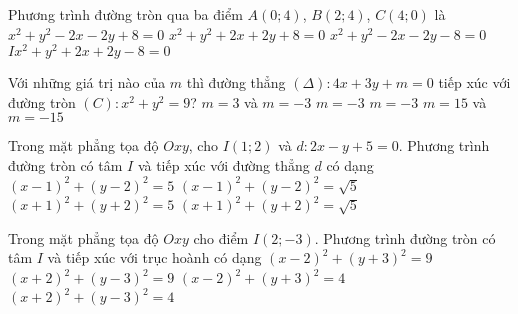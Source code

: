 \begin{ex}%
	Phương trình đường tròn qua ba điểm $A(0;4)$, $B(2;4)$, $C(4;0)$ là
	\choice
	{$x^2+y^2-2x-2y+8=0$}
	{$x^2+y^2+2x+2y+8=0$}
	{\True $x^2+y^2-2x-2y-8=0$}
	{$Ix^2+y^2+2x+2y-8=0$}
\end{ex}

\begin{ex}%
	Với những giá trị nào của $m$ thì đường thẳng $\left(\Delta\right)\colon 4x+3y+m=0$ tiếp xúc với đường tròn $\left(C\right)\colon x^2+y^2=9$?
	\choice
	{$m=3$ và $m=-3$}
	{$m=-3$}
	{$m=-3$}
	{\True $m=15$ và $m=-15$}
\end{ex}

\begin{ex}%
	Trong mặt phẳng tọa độ $Oxy$, cho $I(1;2)$ và $d: 2x-y+5=0$. Phương trình đường tròn có tâm $I$ và tiếp xúc với đường thẳng $d$ có dạng
	\choice
	{\True $(x-1)^2+(y-2)^2=5$}
	{$(x-1)^2+(y-2)^2=\sqrt{5}$}
	{$(x+1)^2+(y+2)^2=5$}
	{$(x+1)^2+(y+2)^2=\sqrt{5}$} 
\end{ex}

\begin{ex}%
	Trong mặt phẳng tọa độ $Oxy$ cho điểm $I(2;-3)$. Phương trình đường tròn có tâm $I$ và tiếp xúc với trục hoành có dạng
	\choice
	{\True $(x-2)^2+(y+3)^2=9$}
	{$(x+2)^2+(y-3)^2=9$}
	{$(x-2)^2+(y+3)^2=4$}
	{$(x+2)^2+(y-3)^2=4$}
\end{ex}

